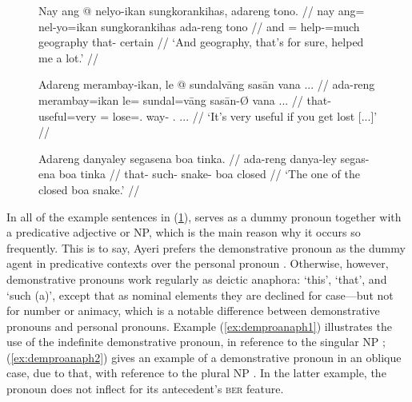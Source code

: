 \begin{figure}[h]
\pex[glspace=0.5em]\label{ex:demexpl}
\a\begingl
	\gla Nay ang @ nelyo-ikan sungkorankihas, adareng tono. //
	\glb nay ang= nel-yo=ikan sungkorankihas ada-reng tono //
	\glc and \AgtT{}= help-\TsgN{}=much geography that-\AargI{} certain //
	\glft `And geography, that's for sure, helped me a lot.'%
		 //
\endgl

\a\begingl
	\gla Adareng merambay-ikan, le @ sundalvāng sasān {vana ...} //
	\glb ada-reng merambay=ikan le= sundal=vāng sasān-Ø {vana ...} //
	\glc that-\AargI{} useful=very \PatTI{}= lose=\Second{}.\Aarg{} way-\Top{} 
		{\Second{}.\Gen{} ...} //
	\glft `It’s very useful if you get lost [...]'%
		 //
\endgl

\a\begingl
	\gla Adareng danyaley segasena boa tinka. //
	\glb ada-reng danya-ley segas-ena boa tinka //
	\glc that-\AargI{} such-\PargI{} snake-\Gen{} boa closed //
	\glft `The one of the closed boa snake.'\footnotemark%
		 //
\endgl
\xe
\end{figure}


In all of the example sentences in (\ref{ex:demexpl}),
 serves as a dummy pronoun together with a
predicative adjective or NP, which is the main reason why it occurs so
frequently. This is to say, Ayeri prefers the demonstrative pronoun
 as the dummy agent in predicative contexts over the
personal pronoun . Otherwise, however, demonstrative
pronouns work regularly as deictic anaphora: `this', `that', and `such (a)',
except that as nominal elements they are declined for case---but not for number
or animacy, which is a notable difference between demonstrative pronouns and
personal pronouns. Example (\ref{ex:demproanaph1}) illustrates the use of the
indefinite demonstrative pronoun,  in reference to
the singular NP ; (\ref{ex:demproanaph2}) gives an
example of a demonstrative pronoun in an oblique case, 
{due to that}, with reference to the plural NP
. In the latter example, the
pronoun does not inflect for its antecedent's \textsc{\Num{}ber} feature.

